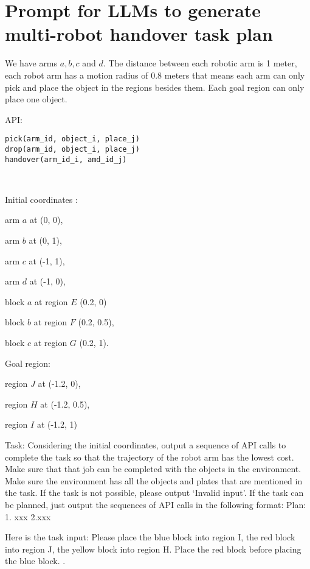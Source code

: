 \documentclass{article}
\begin{document}
\section*{Prompt for LLMs to generate multi-robot handover task plan}%
We have arms $a, b, c$ and $d$. The distance between each robotic arm is 1 meter, each robot arm has a motion radius of 0.8 meters that means each arm can only pick and place the object in the regions besides them. Each goal region can only place one object. 

API: 
\begin{verbatim}
pick(arm_id, object_i, place_j)
drop(arm_id, object_i, place_j)
handover(arm_id_i, amd_id_j)
\end{verbatim}\\
\vspace{1em}

Initial coordinates 
: 

arm $a$ at (0, 0),

arm $b$ at (0, 1), 

arm $c$ at (-1, 1), 

arm $d$ at (-1, 0), 

block $a$ at region $E$ (0.2, 0) 

block $b$ at region $F$ (0.2, 0.5), 

block $c$ at region $G$ (0.2, 1).

Goal region:

    region $J$ at (-1.2, 0), 
    
    region $H$ at (-1.2, 0.5), 
    
    region $I$ at (-1.2, 1)
\vspace{1em}

Task: Considering the initial coordinates, output a sequence of API calls to complete the task so that the trajectory of the robot arm has the lowest cost. Make sure that that job can be completed with the objects in the environment. Make sure the environment has all the objects and plates that are mentioned in the task. If the task is not possible, please output `Invalid input'. If the task can be planned, just output the sequences of API calls in the following format: 
Plan: 1. xxx 2.xxx 
\vspace{1em}

Here is the task input: Please place the blue block into region I, the red block into region J, the yellow block into region H. Place the red block before placing the blue block. 
. 
\end{document}
